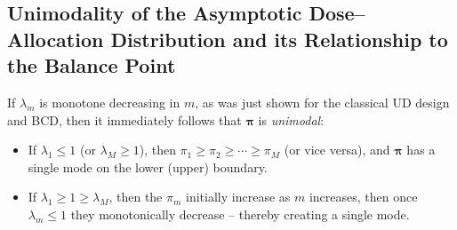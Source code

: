 \subsection{Unimodality of the Asymptotic Dose--Allocation Distribution and its Relationship to the Balance Point}\label{sec:modeloc}

 If $\lambda_m$ is monotone decreasing in $m$, as was just shown for the classical UD design and BCD, then it immediately follows that $\boldsymbol{\pi}$ is \emph{unimodal}:

\begin{itemize}
\item  If $\lambda_1\leq 1$ (or $\lambda_M\geq 1$), then $\pi_1\geq\pi_2\geq\cdots\geq\pi_M$ (or vice versa), and $\boldsymbol{\pi}$ has a single mode on the lower (upper) boundary.
\item If $\lambda_1\geq 1\geq\lambda_M$, then the $\pi_m$ initially increase as $m$ increases, then once $\lambda_m\leq 1$ they monotonically decrease -- thereby creating a single mode.
\end{itemize}

